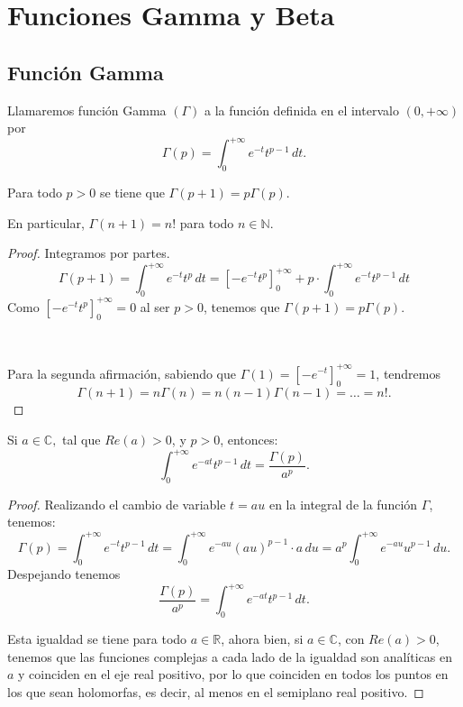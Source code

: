 \chapter{Funciones Gamma y Beta}
\label{ap:apendice1}
\justifying
\section{Función Gamma}
Llamaremos función Gamma $(\Gamma)$ a la función definida
en el intervalo $(0,+\infty)$ por
\begin{equation}
    \Gamma(p)=\int_{0}^{+\infty}e^{-t}t^{p-1}\,dt.
\end{equation}

\begin{theorem}
    Para todo $p>0$ se tiene que $\Gamma(p+1)=p\Gamma(p)$.
    
    En particular, $\Gamma(n+1)=n!$ para todo $n\in\mathbb{N}$.
\end{theorem}

\begin{proof}
    Integramos por partes.
    \[
        \Gamma(p+1)=\int_{0}^{+\infty}e^{-t}t^{p}\,dt
        =\left[-e^{-t}t^{p}\right]_{0}^{+\infty}
        +p\cdot\int_{0}^{+\infty}e^{-t}t^{p-1}\,dt
    \]
    Como $\left[-e^{-t}t^{p}\right]_{0}^{+\infty}=0$ al ser
    $p > 0$, tenemos que $\Gamma(p+1) = p\Gamma(p)$.

    \

    Para la segunda afirmación, sabiendo que $\Gamma(1) = \left[
    -e^{-t}\right]_0^{+\infty}=1$, tendremos
    \[
        \Gamma(n+1)=n\Gamma(n)=n(n-1)\Gamma(n-1)=\dots=n!.
    \]   
\end{proof}

\begin{theorem}
    \label{thm:gamma}
    Si $a\in\mathbb{C},$ tal que $Re(a)>0$, y $p>0$, entonces:
    \[
        \int_{0}^{+\infty}e^{-at}t^{p-1}\,dt=\frac{\Gamma(p)}{a^{p}}.
    \]
\end{theorem}

\begin{proof}
    Realizando el cambio de variable $t = au$ en la integral
    de la función $\Gamma$, tenemos:
    \[
        \Gamma(p)=\int_{0}^{+\infty}e^{-t}t^{p-1}\,dt=
        \int_{0}^{+\infty}e^{-au}(au)^{p-1}\cdot a\,du=
        a^{p}\int_{0}^{+\infty}e^{-au}u^{p-1}\,du.
    \]
    Despejando tenemos
    \[
        \frac{\Gamma(p)}{a^{p}}=\int_{0}^{+\infty}e^{-at}t^{p-1}\,dt.
    \]

    Esta igualdad se tiene para todo $a\in\mathbb{R}$, ahora bien, si
    $a\in\mathbb{C}$, con $Re(a)>0$, tenemos que las funciones
    complejas a cada lado de la igualdad son analíticas en $a$
    y coinciden en el eje real positivo, por lo que coinciden en todos
    los puntos en los que sean holomorfas, es decir, al menos en el
    semiplano real positivo.
\end{proof}

